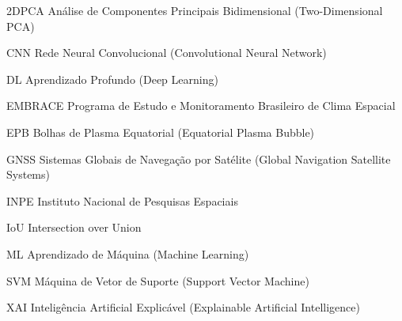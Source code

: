 \documentclass[
   12pt,
   oneside,
   a4paper,
   brazil
]{abntex2}
\begin{document}
\imprimircapa
\imprimirfolhaderosto*

\listoftables

\begin{siglas}
  \item[2DPCA] Análise de Componentes Principais Bidimensional (Two-Dimensional PCA)
  \item[CNN] Rede Neural Convolucional (Convolutional Neural Network)
  \item[DL] Aprendizado Profundo (Deep Learning)
  \item[EMBRACE] Programa de Estudo e Monitoramento Brasileiro de Clima Espacial
  \item[EPB] Bolhas de Plasma Equatorial (Equatorial Plasma Bubble)
  \item[GNSS] Sistemas Globais de Navegação por Satélite (Global Navigation Satellite Systems)
  \item[INPE] Instituto Nacional de Pesquisas Espaciais
  \item[IoU] Intersection over Union
  \item[ML] Aprendizado de Máquina (Machine Learning)
  \item[SVM] Máquina de Vetor de Suporte (Support Vector Machine)
  \item[XAI] Inteligência Artificial Explicável (Explainable Artificial Intelligence)
\end{siglas}

\tableofcontents









\end{document}
